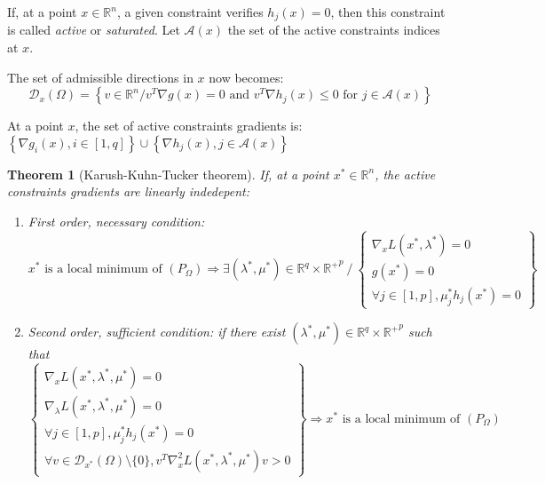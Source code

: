 \documentclass{article}
\newtheorem*{theorem}{Theorem}
\begin{document}
\noindent If, at a point $x\in\mathbb{R}^n$, a given constraint verifies $h_j(x)=0$, then this constraint is called \emph{active} or \emph{saturated}. Let $\mathcal{A}(x)$ the set of the active constraints indices at $x$.

\noindent The set of admissible directions in $x$ now becomes: 
\begin{equation*}
\mathcal{D}_{x}(\Omega) = \left\{ v\in
  \mathbb{R}^n / v^T \nabla g(x) = 0 \textrm{ and } v^T \nabla h_j(x)\leq 0 \textrm{ for }j\in \mathcal{A}(x) \right\}
\end{equation*}

\noindent At a point $x$, the set of active constraints gradients is: $\left\{ \nabla g_i(x), i\in [1,q] \right\} \cup \left\{ \nabla h_j(x), j\in \mathcal{A}(x) \right\}$

\begin{theorem}[Karush-Kuhn-Tucker theorem]
If, at a point $x^*\in\mathbb{R}^n$, the active constraints gradients  are linearly indedepent:
\begin{enumerate}
\item First order, necessary condition: 
\begin{equation*}
x^*\textrm{ is a local minimum of }\left(P_\Omega\right) \Rightarrow \exists \left(\lambda^*,\mu^* \right) \in \mathbb{R}^q\times {\mathbb{R}^+}^p \ / \
\left\{\begin{array}{c}
\nabla_x L(x^*,\lambda^*)=0 \\
g(x^*)=0\\
\forall j\in[1,p], \mu^*_j h_j(x^*) = 0
\end{array} \right\}
\end{equation*}
\item Second order, sufficient condition: if there exist $(\lambda^*,\mu^*) \in \mathbb{R}^q \times {\mathbb{R}^+}^p$ such that 
\begin{equation*}
\left\{\begin{array}{c}
\nabla_x L(x^*,\lambda^*,\mu^*)=0 \\
\nabla_\lambda L(x^*,\lambda^*,\mu^*)=0 \\
\forall j\in[1,p], \mu^*_j h_j(x^*) = 0\\
\forall v\in \mathcal{D}_{x^*}(\Omega)\setminus\{0\}, v^T \nabla_x^2
L(x^*,\lambda^*,\mu^*) v > 0 
\end{array}
\right\} \Rightarrow x^* \textrm{ is a local minimum of } 
\left(P_\Omega\right)
\end{equation*}
\end{enumerate}
\end{theorem}
\end{document}
